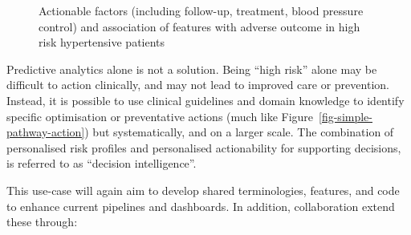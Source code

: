 \documentclass[
  letterpaper,
  DIV=11,
  numbers=noendperiod]{scrartcl}
\begin{document}
\begin{figure}


\caption{\label{fig-htn-actionable}Actionable factors (including
follow-up, treatment, blood pressure control) and association of
features with adverse outcome in high risk hypertensive patients}

\end{figure}%

Predictive analytics alone is not a solution. Being ``high risk'' alone
may be difficult to action clinically, and may not lead to improved care
or prevention. Instead, it is possible to use clinical guidelines and
domain knowledge to identify specific optimisation or preventative
actions (much like Figure~\ref{fig-simple-pathway-action}) but
systematically, and on a larger scale. The combination of personalised
risk profiles and personalised actionability for supporting decisions,
is referred to as ``decision intelligence''.

This use-case will again aim to develop shared terminologies, features,
and code to enhance current pipelines and dashboards. In addition,
collaboration extend these through:
\end{document}
